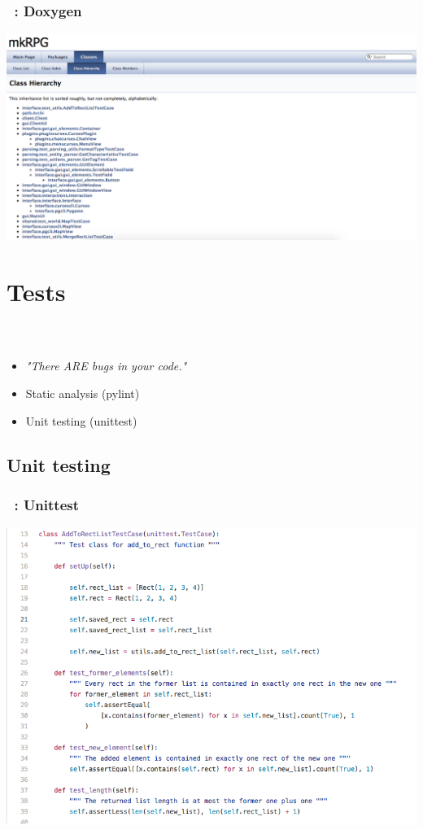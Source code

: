 \documentclass[a4paper, 11pt]{beamer}
\begin{document}
\begin{frame}
    \frametitle{\secname~: Doxygen}
\includegraphics[scale=0.3]{doxygen}
\end{frame}

\section{Tests}
\begin{frame}
    \frametitle{\secname~}
    \begin{itemize}
    	\item \textit{"There ARE bugs in your code."}
        \item Static analysis (pylint)
        \item Unit testing (unittest)
    \end{itemize}
\end{frame}

\subsection{Unit testing}
\begin{frame}
    \frametitle{\secname~: Unittest}
\includegraphics[scale=0.4]{unittest}
\end{frame}
\end{document}
